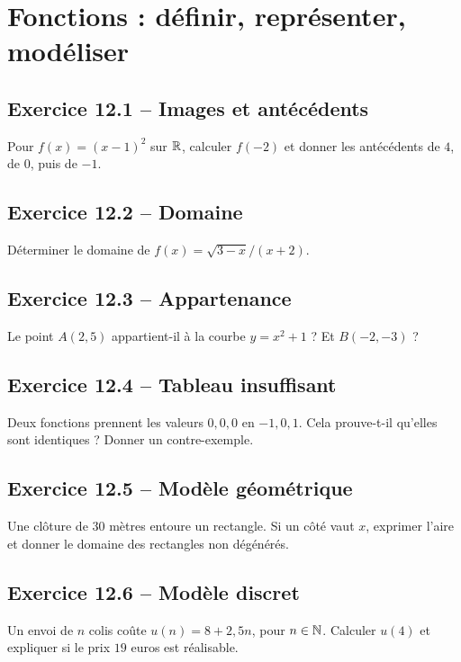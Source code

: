 \chapter{Fonctions : définir, représenter, modéliser}
\section*{Exercice 12.1 -- Images et antécédents}
Pour $f(x)=(x-1)^2$ sur $\mathbb{R}$, calculer $f(-2)$ et donner les antécédents de $4$, de $0$, puis de $-1$.

\section*{Exercice 12.2 -- Domaine}
Déterminer le domaine de $f(x)=\sqrt{3-x}/(x+2)$.

\section*{Exercice 12.3 -- Appartenance}
Le point $A(2,5)$ appartient-il à la courbe $y=x^2+1$ ? Et $B(-2,-3)$ ?

\section*{Exercice 12.4 -- Tableau insuffisant}
Deux fonctions prennent les valeurs $0,0,0$ en $-1,0,1$. Cela prouve-t-il qu'elles sont identiques ? Donner un contre-exemple.

\section*{Exercice 12.5 -- Modèle géométrique}
Une clôture de $30$ mètres entoure un rectangle. Si un côté vaut $x$, exprimer l'aire et donner le domaine des rectangles non dégénérés.

\section*{Exercice 12.6 -- Modèle discret}
Un envoi de $n$ colis coûte $u(n)=8+2{,}5n$, pour $n\in\mathbb{N}$. Calculer $u(4)$ et expliquer si le prix $19$ euros est réalisable.
